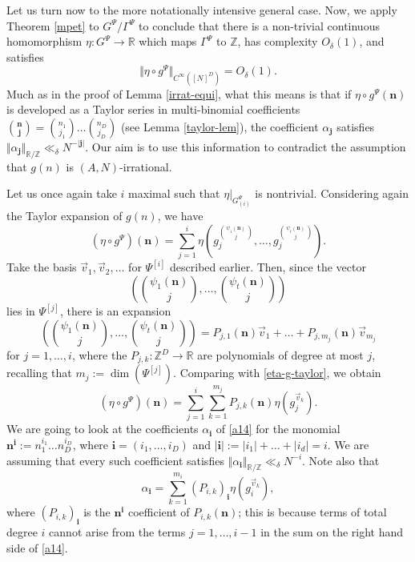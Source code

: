 \documentclass[11pt,reqno]{amsart}
\numberwithin{equation}{section}
\theoremstyle{plain}
\theoremstyle{definition}
\newcommand\Z{\mathbb{Z}}
\newcommand\R{\mathbb{R}}
\newcommand\1{{\bf 1}}
\newcommand\2{{\bf 2}}
\begin{document}
Let us turn now to the more notationally intensive general case. Now, we apply Theorem \ref{mpet} to $G^{\Psi}/\Gamma^{\Psi}$ to conclude that there is a non-trivial continuous homomorphism $\eta : G^{\Psi} \rightarrow \R$ which maps $\Gamma^{\Psi}$ to $\Z$, has complexity $O_\delta(1)$, and satisfies 
\begin{equation}\label{smoothness-d} \Vert \eta \circ g^{\Psi} \Vert_{C^{\infty}([N]^D)} = O_\delta(1).\end{equation} Much as in the proof of Lemma \ref{irrat-equi}, what this means is that if $\eta \circ g^{\Psi}(\mathbf{n})$ is developed as a Taylor series in multi-binomial coefficients $\binom{\mathbf{n}}{\mathbf{j}} = \binom{n_1}{j_1} \dots \binom{n_D}{j_D}$ (see Lemma \ref{taylor-lem}), the coefficient $\alpha_{\mathbf{j}}$ satisfies $\Vert \alpha_{\mathbf{j}} \Vert_{\R/\Z} \ll_\delta N^{-|\mathbf{j}|}$. Our aim is to use this information to contradict the assumption that $g(n)$ is $(A,N)$-irrational.

Let us once again take $i$ maximal such that $\eta |_{G^{\Psi}_{(i)}}$ is nontrivial.  
Considering again the Taylor expansion of $g(n)$, we have
\begin{equation}\label{eta-g-taylor} (\eta \circ g^{\Psi})(\mathbf{n}) = \sum_{j=1}^i \eta (g_j^{\binom{\psi_1(\mathbf{n})}{j}},\dots, g_j^{\binom{\psi_t(\mathbf{n})}{j}}).\end{equation}
Take the basis $\vec{v}_1,\vec{v}_2,\dots$ for $\Psi^{[i]}$ described earlier. Then, since the vector \[ \textstyle (\binom{\psi_1(\mathbf{n})}{j},\dots,\binom{\psi_t(\mathbf{n})}{j})\] lies in $\Psi^{[j]}$, there is an expansion
\begin{equation}\label{a13} \textstyle(\binom{\psi_1(\mathbf{n})}{j},\dots,\binom{\psi_t(\mathbf{n})}{j}) \displaystyle= P_{j,1}(\mathbf{n}) \vec{v}_1 + \dots + P_{j,m_j} (\mathbf{n})\vec{v}_{m_j}\end{equation} for $j = 1,\dots, i$, where the $P_{j,k}: \Z^D \to \R$ are polynomials of degree at most $j$, recalling that $m_j := \dim (\Psi^{[j]})$.
Comparing with \eqref{eta-g-taylor}, we obtain
\begin{equation}\label{a14}(\eta \circ g^{\Psi})(\mathbf{n}) = \sum_{j=1}^i \sum_{k = 1}^{m_j}P_{j, k}(\mathbf{n}) \eta(g_j^{\vec{v}_k}).\end{equation}
We are going to look at the coefficients $\alpha_{\mathbf{i}}$ of \eqref{a14} for the monomial $\mathbf{n}^{\mathbf{i}} := n_1^{i_1} \dots n_D^{i_D}$, where $\mathbf{i} = (i_1,\dots, i_D)$ and  $|\mathbf{i}| := |i_1| + \dots + |i_d| = i$.  We are assuming that every such coefficient satisfies $\Vert \alpha_{\mathbf{i}} \Vert_{\R/\Z} \ll_\delta N^{-i}$. Note also that
\begin{equation}\label{a15} \alpha_{\mathbf{i}} = \sum_{k=1}^{m_i} (P_{i,k})_{\mathbf{i}} \eta(g_i^{\vec{v}_k}),\end{equation}
where $(P_{i,k})_{\mathbf{i}}$ is the ${\mathbf{n}}^{\mathbf{i}}$ coefficient of $P_{i,k}({\mathbf n})$; this is because terms of total degree $i$ cannot arise from the terms $j = 1,\dots, i-1$ in the sum on the right hand side of \eqref{a14}.
\end{document}
